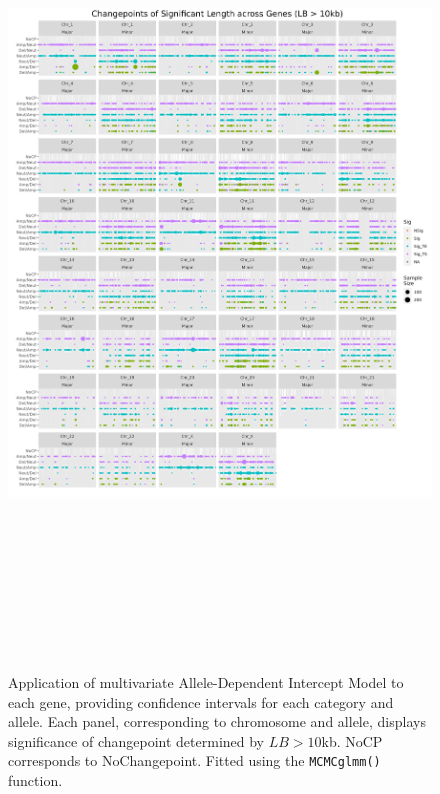 \begin{figure}[H]
\centering
\includegraphics[width = 1\textwidth, height = 22cm]{../figures/Chapter_6/PerGene_MCMC_Zero_Thesis.png}
\caption[Application of multivariate Allele-Dependent Intercept Model to each gene ($LB > 10$kb).]{Application of multivariate Allele-Dependent Intercept Model to each gene, providing confidence intervals for each category and allele. Each panel, corresponding to chromosome and allele, displays significance of changepoint determined by $LB > 10$kb. NoCP corresponds to NoChangepoint. Fitted using the \texttt{MCMCglmm()} function.}
\label{fig:PerGene_MCMC}
\end{figure}

